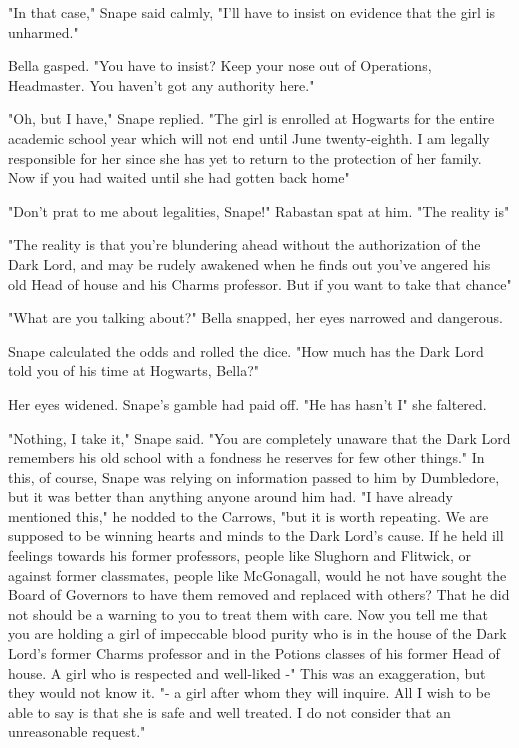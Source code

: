 "In that case," Snape said calmly, "I'll have to insist on evidence that the girl is unharmed."

Bella gasped. "You have to insist? Keep your nose out of Operations, Headmaster. You haven't got any authority here."

"Oh, but I have," Snape replied. "The girl is enrolled at Hogwarts for the entire academic school year which will not end until June twenty-eighth. I am legally responsible for her since she has yet to return to the protection of her family. Now if you had waited until she had gotten back home{\el}"

"Don't prat to me about legalities, Snape!" Rabastan spat at him. "The reality is{\el}"

"The reality is that you're blundering ahead without the authorization of the Dark Lord, and may be rudely awakened when he finds out you've angered his old Head of house and his Charms professor. But if you want to take that chance{\el}"

"What are you talking about?" Bella snapped, her eyes narrowed and dangerous.

Snape calculated the odds and rolled the dice. "How much has the Dark Lord told you of his time at Hogwarts, Bella?"

Her eyes widened. Snape's gamble had paid off. "He has{\el} hasn't{\el} I{\el}" she faltered.

"Nothing, I take it," Snape said. "You are completely unaware that the Dark Lord remembers his old school with a fondness he reserves for few other things." In this, of course, Snape was relying on information passed to him by Dumbledore, but it was better than anything anyone around him had. "I have already mentioned this," he nodded to the Carrows, "but it is worth repeating. We are supposed to be winning hearts and minds to the Dark Lord's cause. If he held ill feelings towards his former professors, people like Slughorn and Flitwick, or against former classmates, people like McGonagall, would he not have sought the Board of Governors to have them removed and replaced with others? That he did not should be a warning to you to treat them with care. Now you tell me that you are holding a girl of impeccable blood purity who is in the house of the Dark Lord's former Charms professor and in the Potions classes of his former Head of house. A girl who is respected and well-liked -" This was an exaggeration, but they would not know it. "- a girl after whom they will inquire. All I wish to be able to say is that she is safe and well treated. I do not consider that an unreasonable request."

